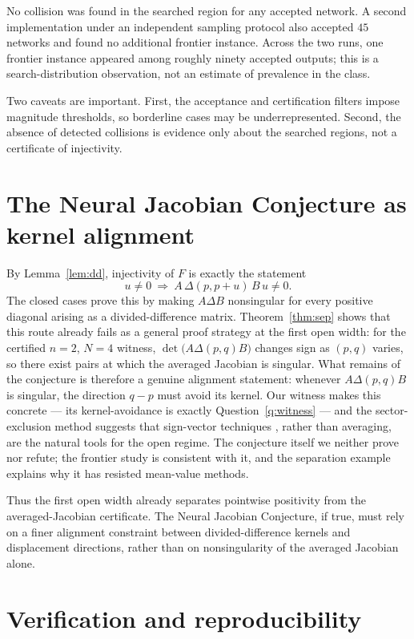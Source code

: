 \documentclass[11pt]{article}
\theoremstyle{definition}
\theoremstyle{remark}
\begin{document}
No collision was found in the searched region for any accepted
network. A second implementation under an independent sampling protocol
also accepted $45$ networks and found no additional frontier instance.
Across the two runs, one frontier instance appeared among roughly
ninety accepted outputs; this is a search-distribution observation, not
an estimate of prevalence in the class.

Two caveats are important. First, the acceptance and certification
filters impose magnitude thresholds, so borderline cases may be
underrepresented. Second, the absence of detected collisions is
evidence only about the searched regions, not a certificate of
injectivity.

\section{The Neural Jacobian Conjecture as kernel alignment}
\label{sec:njc}

By Lemma~\ref{lem:dd}, injectivity of $F$ is exactly the statement
\[
u\ne0\ \Longrightarrow\ A\,\Delta(p,p+u)\,B\,u\ne0 .
\]
The closed cases prove this by making $A\Delta B$ nonsingular for every
positive diagonal arising as a divided-difference matrix.
Theorem~\ref{thm:sep} shows that this route already fails as a general
proof strategy at the first open width: for the certified $n=2$, $N=4$
witness, $\det\bigl(A\Delta(p,q)B\bigr)$ changes sign as $(p,q)$
varies, so there exist pairs at which the averaged Jacobian is singular.
What remains of the conjecture is therefore a genuine alignment
statement: whenever $A\Delta(p,q)B$ is singular, the direction $q-p$ must
avoid its kernel. Our witness makes this concrete --- its kernel-avoidance
is exactly Question~\ref{q:witness} --- and the sector-exclusion method
suggests that sign-vector techniques \cite{mhr,muelleretal,fmr}, rather
than averaging, are the natural tools for the open regime. The conjecture
itself we neither prove nor refute; the frontier study is consistent
with it, and the separation example
explains why it has resisted mean-value methods.

Thus the first open width already separates pointwise positivity from
the averaged-Jacobian certificate. The Neural Jacobian Conjecture, if
true, must rely on a finer alignment constraint between
divided-difference kernels and displacement directions, rather than on
nonsingularity of the averaged Jacobian alone.

\section{Verification and reproducibility}\label{sec:repro}
\end{document}
